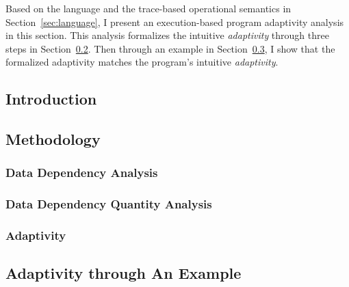 
Based on the language and the trace-based operational semantics in Section~\ref{sec:language},
I present an execution-based program adaptivity analysis in this section.
This analysis formalizes the intuitive \emph{adaptivity} through three steps in 
Section~\ref{subsec:dynamic-methodology}.
Then through an example in Section~\ref{subsec:dynamic-examples}, I show that the formalized
adaptivity matches the program's intuitive \emph{adaptivity}.

\subsection{Introduction}
\label{subsec:dynamic-intro}


\subsection{Methodology}
\label{subsec:dynamic-methodology}

\subsubsection{Data Dependency Analysis}
\label{subsubsec:dynamic-datadep}

\subsubsection{Data Dependency Quantity Analysis}
\label{subsubsec:dynamic-reachability}
%
\subsubsection{Adaptivity}
\label{subsubsec:dynamic-adapt}
%
%
\subsection{Adaptivity through An Example}
\label{subsec:dynamic-examples}

%

% 
%
%